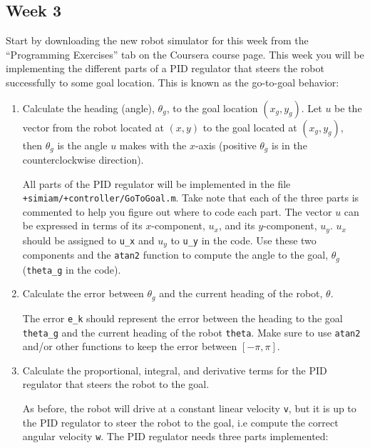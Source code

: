 \documentclass[10pt]{article}
\begin{document}
\subsection{Week 3}

Start by downloading the new robot simulator for this week from the ``Programming Exercises'' tab on the Coursera course page. This week you will be implementing the different parts of a PID regulator that steers the robot successfully to some goal location. This is known as the go-to-goal behavior:

\begin{enumerate}
 \item Calculate the heading (angle), $\theta_g$, to the goal location $(x_g,y_g)$. Let $u$ be the vector from the robot located at $(x,y)$ to the goal located at $(x_g,y_g)$, then $\theta_g$ is the angle $u$ makes with the $x$-axis (positive $\theta_g$ is in the counterclockwise direction).

All parts of the PID regulator will be implemented in the file \texttt{+simiam/+controller/GoToGoal.m}. Take note that each of the three parts is commented to help you figure out where to code each part. The vector $u$ can be expressed in terms of its $x$-component, $u_x$, and its $y$-component, $u_y$. $u_x$ should be assigned to \texttt{u\_x} and $u_y$ to \texttt{u\_y} in the code. Use these two components and the \texttt{atan2} function to compute the angle to the goal, $\theta_g$ (\texttt{theta\_g} in the code).


 \item Calculate the error between $\theta_g$ and the current heading of the robot, $\theta$.
 
 The error \texttt{e\_k} should represent the error between the heading to the goal \texttt{theta\_g} and the current heading of the robot \texttt{theta}. Make sure to use \texttt{atan2} and/or other functions to keep the error between $[-\pi,\pi]$.
 
 \item Calculate the proportional, integral, and derivative terms for the PID regulator that steers the robot to the goal.
 
 As before, the robot will drive at a constant linear velocity \texttt{v}, but it is up to the PID regulator to steer the robot to the goal, i.e compute the correct angular velocity \texttt{w}. The PID regulator needs three parts implemented:
 

\end{enumerate}
\end{document}

